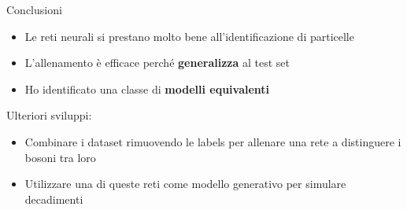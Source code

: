 \documentclass{beamer}
\begin{document}
\begin{frame}{Conclusioni}
  \begin{itemize}
    \item Le reti neurali si prestano molto bene all'identificazione di particelle
    \item L'allenamento è efficace perché \textbf{generalizza} al test set
    \item Ho identificato una classe di \textbf{modelli equivalenti}
  \end{itemize}
  \vspace{2ex}

  Ulteriori sviluppi: 
  \begin{itemize}
    \item Combinare i dataset rimuovendo le labels per allenare una rete a distinguere i bosoni tra loro
    \item Utilizzare una di queste reti come modello generativo per simulare decadimenti
  \end{itemize}
%
    \begin{columns}
      {
        \begin{block}{}
          \centering\vspace*{.5ex}
        \vspace*{.5ex}
      \end{block}
      }
    \end{columns}
\end{frame}
\end{document}
